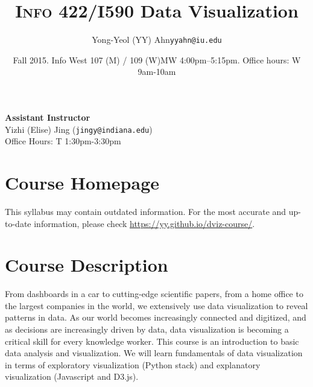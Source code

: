 \documentclass[11pt,article,oneside]{memoir}
\makeatletter
\def\myauthor{Author}
\def\mytitle{Title}
\def\myemail{yyahn@iu.edu}
\def\myauthor{Yong-Yeol (YY) Ahn}
\def\mytitle{{\normalsize \textsc{Info} 422/I590 \newline} \HUGE Data Visualization}
\makeatother
\begin{document}

\def\ind{\hangindent=1 true cm\hangafter=1 \noindent}
\def\labelitemi{$\cdot$}


\title{\LARGE \mytitle}     
\author{\Large\myauthor \newline \footnotesize\texttt{\noindent\myemail}}
\date{Fall 2015. Info West 107 (M) / 109 (W)\newline MW 4:00pm--5:15pm. \newline Office hours: W 9am-10am}

\maketitle

\vspace{-20pt}
{\bfseries Assistant Instructor} \\ Yizhi (Elise) Jing (\texttt{jingy@indiana.edu}) \\ Office Hours: T 1:30pm-3:30pm 

\section{Course Homepage}

This syllabus may contain outdated information. For the most accurate and up-to-date information, 
please check \url{https://yy.github.io/dviz-course/}. 

\section{Course Description}

From dashboards in a car to cutting-edge scientific papers, from a home office
to the largest companies in the world, we extensively use data visualization to
reveal patterns in data. As our world becomes increasingly connected and
digitized, and as decisions are increasingly driven by data, data visualization
is becoming a critical skill for every knowledge worker. This course is an
introduction to basic data analysis and visualization. We will learn
fundamentals of data visualization in terms of exploratory visualization
(Python stack) and explanatory visualization (Javascript and D3.js).  
\end{document}
